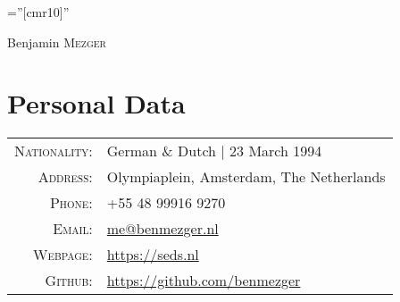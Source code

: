 \documentclass[a4paper,10pt]{article}
\begin{document}

\pagestyle{empty} %

\font\fb=''[cmr10]'' %

\par{\centering
		{\Huge Benjamin \textsc{Mezger}
	}\bigskip\par}

\section{Personal Data}

\begin{tabular}{rp{12cm}}
    \textsc{Nationality:} & German \& Dutch  | 23 March 1994 \\
    \textsc{Address:}     & Olympiaplein, Amsterdam, The Netherlands \\
    \textsc{Phone:}       & +55 48 99916 9270 \\
    \textsc{Email:}       & \href{mailto:me@benmezger.nl}{me@benmezger.nl} \\
    \textsc{Webpage:}     & \url{https://seds.nl} \\
    \textsc{Github:}      & \url{https://github.com/benmezger}
\end{tabular}

\end{document}
